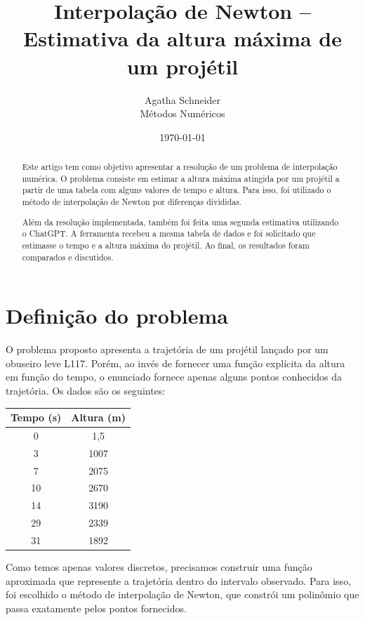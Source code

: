 \documentclass[12pt,brazil,a4paper, twocolumn]{article}
\begin{document}
\title{Interpolação de Newton -- Estimativa da altura máxima de um projétil}

\author{Agatha Schneider\\
Métodos Numéricos}

\date{\today}
\maketitle

\begin{abstract}
Este artigo tem como objetivo apresentar a resolução de um problema de interpolação numérica. O problema consiste em estimar a altura máxima atingida por um projétil a partir de uma tabela com alguns valores de tempo e altura. Para isso, foi utilizado o método de interpolação de Newton por diferenças divididas.

Além da resolução implementada, também foi feita uma segunda estimativa utilizando o ChatGPT. A ferramenta recebeu a mesma tabela de dados e foi solicitado que estimasse o tempo e a altura máxima do projétil. Ao final, os resultados foram comparados e discutidos.
\end{abstract}

\section{Definição do problema}

O problema proposto apresenta a trajetória de um projétil lançado por um obuseiro leve L117. Porém, ao invés de fornecer uma função explícita da altura em função do tempo, o enunciado fornece apenas alguns pontos conhecidos da trajetória. Os dados são os seguintes:

\begin{center}
\begin{tabular}{c|c}
Tempo (s) & Altura (m)\\
\hline
0 & 1,5\\
3 & 1007\\
7 & 2075\\
10 & 2670\\
14 & 3190\\
29 & 2339\\
31 & 1892\\
\end{tabular}
\end{center}

Como temos apenas valores discretos, precisamos construir uma função aproximada que represente a trajetória dentro do intervalo observado. Para isso, foi escolhido o método de interpolação de Newton, que constrói um polinômio que passa exatamente pelos pontos fornecidos.
\end{document}
